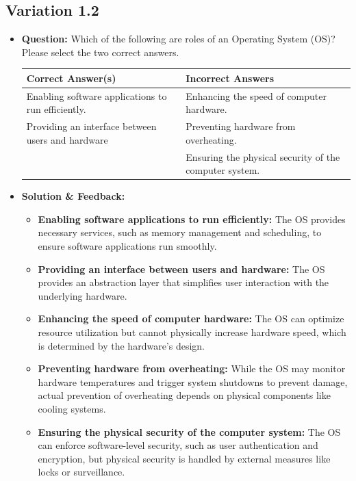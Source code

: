 \subsection{Variation 1.2}
\begin{itemize}
    \item \textbf{Question:} Which of the following are roles of an Operating System (OS)? Please select the two correct answers.\\
    \begin{tabularx}{\textwidth}{|X|X|}
        \hline
        \textbf{Correct Answer(s)} & \textbf{Incorrect Answers} \\
        \hline
        Enabling software applications to run efficiently. & Enhancing the speed of computer hardware. \\
        Providing an interface between users and hardware & Preventing hardware from overheating. \\
         & Ensuring the physical security of the computer system. \\
        \hline
    \end{tabularx}
    
    \item \textbf{Solution \& Feedback:}
    \begin{itemize}
        \item \textbf{Enabling software applications to run efficiently:} The OS provides necessary services, such as memory management and scheduling, to ensure software applications run smoothly.
        \item \textbf{Providing an interface between users and hardware:} The OS provides an abstraction layer that simplifies user interaction with the underlying hardware.
        \item \textbf{Enhancing the speed of computer hardware:} The OS can optimize resource utilization but cannot physically increase hardware speed, which is determined by the hardware's design.
        \item \textbf{Preventing hardware from overheating:} While the OS may monitor hardware temperatures and trigger system shutdowns to prevent damage, actual prevention of overheating depends on physical components like cooling systems.
        \item \textbf{Ensuring the physical security of the computer system:} The OS can enforce software-level security, such as user authentication and encryption, but physical security is handled by external measures like locks or surveillance.
    \end{itemize}
\end{itemize}

